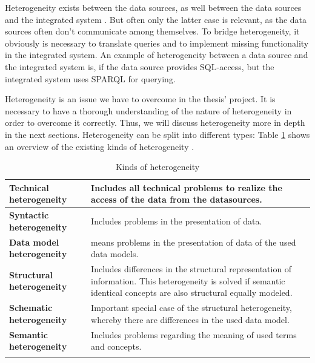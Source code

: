 Heterogeneity exists between the data sources, as well between the data sources and the integrated system \cite[p. 60]{DBLP:books/dp/LeserN2006}. But often only the latter case is relevant, as the data sources often don't communicate among themselves. To bridge heterogeneity, it obviously is necessary to translate queries and to implement missing functionality in the integrated system. An example of heterogeneity between a data source and the integrated system is, if the data source provides SQL-access, but the integrated system uses SPARQL for querying.

Heterogeneity is an issue we have to overcome in the thesis' project. It is necessary to have a thorough understanding of the nature of heterogeneity in order to overcome it correctly. Thus, we will discuss heterogeneity more in depth in the next sections. Heterogeneity can be split into different types: Table \ref{kinds-of-heterogeneity} shows an overview of the existing kinds of heterogeneity \cite[p. 60/61]{DBLP:books/dp/LeserN2006}.

\begin{longtable}{|l|p{}|}
\hline
 \textbf{Technical  heterogeneity}  &  Includes all technical problems to realize the access of the data from the datasources.\\ \hline
 \textbf{Syntactic  heterogeneity}    &  Includes problems in the presentation of data.\\ \hline
 \textbf{Data model  heterogeneity} &  means problems in the presentation of data of the used data models. \\ \hline
 \textbf{Structural  heterogeneity}    &  Includes differences in the structural representation of information. This heterogeneity is solved if semantic identical concepts are also structural equally modeled. \\ \hline
 \textbf{Schematic  heterogeneity} &  Important special case of the structural heterogeneity, whereby there are differences in the used data model.\\ \hline
 \textbf{Semantic  heterogeneity}    &  Includes problems regarding the meaning of used terms and concepts.\\ \hline
\caption{Kinds of heterogeneity \cite[p. 60/61]{DBLP:books/dp/LeserN2006}}
\label{kinds-of-heterogeneity}
\end{longtable}

